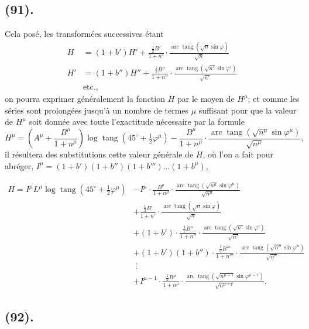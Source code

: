 \documentclass{article}
\begin{document}
\subsection*{(91).}

Cela posé, les transformées successives étant
\[ \begin{aligned} H&=(1+b')H'+\frac{\tfrac{1}{2}B'}{1+n'}\cdot\frac{\operatorname{arc}\operatorname{tang}(\sqrt{n}\sin\varphi)}{\sqrt{n}}\\ H'&=(1+b'')H''+\frac{\tfrac{1}{2}B''}{1+n''}\cdot\frac{\operatorname{arc}\operatorname{tang}(\sqrt{n'}\sin\varphi')}{\sqrt{n'}}\\ &\text{etc.}, \end{aligned} \]
on pourra exprimer généralement la fonction $H$ par le moyen de $H^{\mu}$; et comme les séries sont prolongées jusqu'à un nombre de termes $\mu$ suffisant pour que la valeur de $H^{\mu}$ soit donnée avec toute l'exactitude nécessaire par la formule
\[ H^{\mu}=\left(A^{\mu}+\frac{B^{\mu}}{1+n^{\mu}}\right)\log\operatorname{tang}(45^{\circ}+\tfrac{1}{2}\varphi^{\mu})-\frac{B^{\mu}}{1+n^{\mu}}\cdot\frac{\operatorname{arc}\operatorname{tang}(\sqrt{n^{\mu}}\sin\varphi^{\mu})}{\sqrt{n^{\mu}}}, \]
il résultera des substitutions cette valeur générale de $H$, où l'on a fait pour abréger, $I^{\mu}=(1+b')(1+b'')(1+b''')\ldots(1+b^{\mu})$,

\[ \begin{aligned} H=I^{\mu}L^{\mu}\log\operatorname{tang}(45^{\circ}+\tfrac{1}{2}\varphi^{\mu})&-I^{\mu}\cdot\frac{B^{\mu}}{1+n^{\mu}}\cdot\frac{\operatorname{arc}\operatorname{tang}(\sqrt{n^{\mu}}\sin\varphi^{\mu})}{\sqrt{n^{\mu}}}\\ &+\frac{\tfrac{1}{2}B'}{1+n'}\cdot\frac{\operatorname{arc}\operatorname{tang}(\sqrt{n}\sin\varphi)}{\sqrt{n}}\\ &+(1+b')\cdot\frac{\tfrac{1}{2}B''}{1+n''}\cdot\frac{\operatorname{arc}\operatorname{tang}(\sqrt{n'}\sin\varphi')}{\sqrt{n'}}\\ &+(1+b')(1+b'')\cdot\frac{\tfrac{1}{2}B'''}{1+n'''}\cdot\frac{\operatorname{arc}\operatorname{tang}(\sqrt{n''}\sin\varphi'')}{\sqrt{n''}}\\ &\ \vdots\\ &+I^{\mu-1}\cdot\frac{\tfrac{1}{2}B^{\mu}}{1+n^{\mu}}\cdot\frac{\operatorname{arc}\operatorname{tang}(\sqrt{n^{\mu-1}}\sin\varphi^{\mu-1})}{\sqrt{n^{\mu-1}}}. \end{aligned} \]

\subsection*{(92).}
\end{document}
